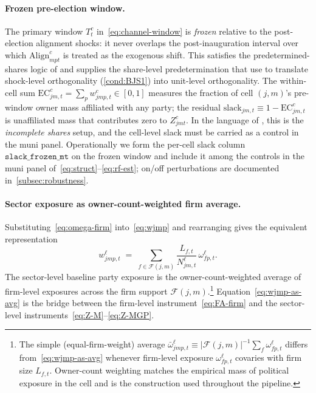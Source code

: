 \documentclass{article}
\newcommand{\Align}{\mathrm{Align}}
\newcommand{\EC}{\mathrm{EC}}
\newcommand{\cF}{\mathcal{F}}
\theoremstyle{plain}
\theoremstyle{definition}
\theoremstyle{remark}
\begin{document}
\paragraph{Frozen pre-election window.}
The primary window $T^c_t$ in~\eqref{eq:channel-window} is
\emph{frozen} relative to the post-election alignment shocks: it never overlaps
the post-inauguration interval over which $\Align^{c}_{mpt}$ is treated as
the exogenous shift. This satisfies the predetermined-shares logic of
\citet{goldsmith2020bartik} and supplies the share-level predetermination that
\citet{borusyak2022quasi} use to translate shock-level orthogonality
(\autoref{cond:BJS1}) into unit-level orthogonality. The within-cell sum
$\EC^{c}_{jm,t}=\sum_p w^{c}_{jmp,t}\in[0,1]$ measures the
fraction of cell $(j,m)$'s pre-window owner mass affiliated with any party; the
residual $\mathrm{slack}_{jm,t}\equiv 1-\EC^{c}_{jm,t}$ is unaffiliated
mass that contributes zero to $Z^{c}_{jmt}$. In the language of
\citet[\S4.4]{borusyak2022quasi}, this is the \emph{incomplete shares} setup,
and the cell-level slack must be carried as a control in the muni panel.
Operationally we form the per-cell slack column $\mathtt{slack\_frozen\_mt}$
on the frozen window and include it among the controls in the muni panel
of~\eqref{eq:struct}--\eqref{eq:rf-est}; on/off perturbations are documented
in~\autoref{subsec:robustness}.

\paragraph{Sector exposure as owner-count-weighted firm average.}
Substituting~\eqref{eq:omega-firm} into~\eqref{eq:wjmp} and rearranging
gives the equivalent representation
\begin{equation}\label{eq:wjmp-as-avg}
  w^{\ell}_{jmp,t}
  \;=\;
  \sum_{f\in\cF(j,m)}
       \frac{L_{f,t}}{N^{\ell}_{jm,t}}\,\omega^{\ell}_{fp,t}.
\end{equation}
The sector-level baseline party exposure is the owner-count-weighted
average of firm-level exposures across the firm support
$\cF(j,m)$.\footnote{The simple (equal-firm-weight) average
$\bar\omega^{\ell}_{jmp,t}\equiv |\cF(j,m)|^{-1}\sum_{f}\omega^{\ell}_{fp,t}$
differs from~\eqref{eq:wjmp-as-avg} whenever firm-level exposure
$\omega^{\ell}_{fp,t}$ covaries with firm size $L_{f,t}$. Owner-count
weighting matches the empirical mass of political exposure in the cell
and is the construction used throughout the pipeline.}
Equation~\eqref{eq:wjmp-as-avg} is the bridge between the firm-level
instrument~\eqref{eq:FA-firm} and the sector-level
instruments~\eqref{eq:Z-M}--\eqref{eq:Z-MGP}.
\end{document}
